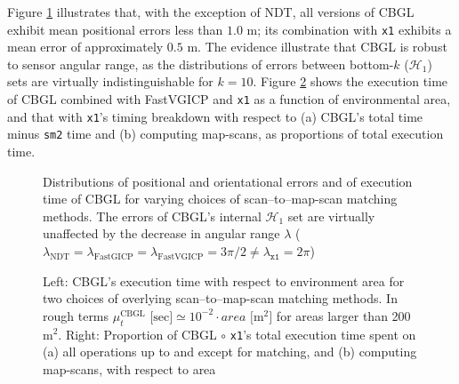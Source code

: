 Figure \ref{fig:c:errors_and_time} illustrates that, with the exception of NDT,
all versions of CBGL exhibit mean positional errors less than $1.0$ m; its
combination with \texttt{x1} exhibits a mean error of approximately $0.5$ m.
The evidence illustrate that CBGL is robust to sensor angular range, as the
distributions of errors between bottom-$k$ ($\mathcal{H}_1$) sets are
virtually indistinguishable for $k=10$. Figure \ref{fig:c:time_analysis} shows
the execution time of CBGL combined with FastVGICP and \texttt{x1} as a
function of environmental area, and that with \texttt{x1}'s timing breakdown
with respect to (a) CBGL's total time minus \texttt{sm2} time and (b) computing
map-scans, as proportions of total execution time.

\begin{figure}
  
  \vspace{0.1cm}
  \caption{\small Distributions of positional and orientational errors and of
           execution time of CBGL for varying choices of scan--to--map-scan
           matching methods. The errors of CBGL's internal $\mathcal{H}_1$ set
           are virtually unaffected by the decrease in angular range $\lambda$
           ($\lambda_{\text{NDT}} = \lambda_{\text{FastGICP}} =
           \lambda_{\text{FastVGICP}} = 3\pi/2 \neq \lambda_{\texttt{x1}} = 2\pi$)
           }
  \label{fig:c:errors_and_time}
\end{figure}

\begin{figure}
  \vspace{0.5cm}
  
  \vspace{0.6cm}
  \caption{\small Left: CBGL's execution time with respect to environment area
           for two choices of overlying scan--to--map-scan matching methods. In
           rough terms $\mu_t^{\text{CBGL}} \text{ [sec]} \simeq 10^{-2}\cdot area
           \text{ [} \text{m}^2 \text{]}$ for areas larger than 200 m$^2$.
           Right: Proportion of CBGL $\circ$ \texttt{x1}'s total execution time
           spent on (a) all operations up to and except for matching, and (b)
           computing map-scans, with respect to area}
  \vspace{-0.2cm}
  \label{fig:c:time_analysis}
\end{figure}
